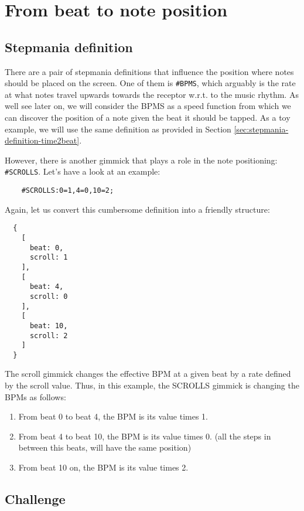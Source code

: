 \documentclass[a4paper,9pt]{article}
\begin{document}
    \section{From beat to note position}

    \subsection{Stepmania definition}

    There are a pair of stepmania definitions that influence the position where notes should be placed on the screen. One of them is \texttt{\#BPMS}, which arguably is the rate at what notes travel upwards towards the receptor w.r.t. to the music rhythm. As well see later on, we will consider the BPMS as a speed function from which we can discover the position of a note given the beat it should be tapped. As a toy example, we will use the same definition as provided in Section \ref{sec:stepmania-definition-time2beat}. 

    However, there is another gimmick that plays a role in the note positioning: \texttt{\#SCROLLS}. Let's have a look at an example:

    \begin{verbatim}
    #SCROLLS:0=1,4=0,10=2;     
    \end{verbatim}
    Again, let us convert this cumbersome definition into a friendly structure:
    \begin{verbatim}
  {
    [
      beat: 0,
      scroll: 1
    ],
    [
      beat: 4,
      scroll: 0 
    ],
    [
      beat: 10,
      scroll: 2 
    ]
  }
    \end{verbatim}
    The scroll gimmick changes the effective BPM at a given beat by a rate defined by the scroll value. Thus, in this example, the SCROLLS gimmick is changing the BPMs as follows:
    \begin{enumerate}
		\item From beat 0 to beat 4, the BPM is its value times 1.
		\item From beat 4 to beat 10, the BPM is its value times 0. (all the steps in between this beats, will have the same position)
		\item From beat 10 on, the BPM is its value times 2.
    \end{enumerate}
    \subsection{Challenge}
\end{document}
